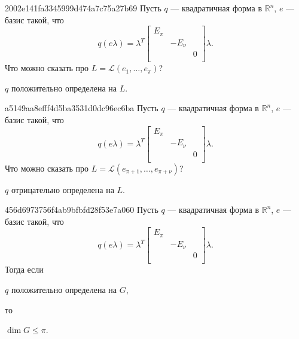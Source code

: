 \begin{note}{2002e141fa3345999d474a7c75a27b69}
    Пусть \({ q }\) --- квадратичная форма в \({ \mathbb R^{n} }\),
    \({ e }\) --- базис такой, что
    \[
        q(e\lambda) = \lambda^{T} \begin{bmatrix}
            E_{\pi}   \\
            & -E_{\nu} \\
            && 0      \\
        \end{bmatrix}
        \lambda.
    \]
    Что можно сказать про \({ L = \mathscr L (e_1, \ldots, e_{\pi}) }\)?

    \begin{cloze}{1}
        \({ q }\) положительно определена на \({ L }\).
    \end{cloze}
\end{note}

\begin{note}{a5149aa8efff4d5ba3531d0dc96ec6ba}
    Пусть \({ q }\) --- квадратичная форма в \({ \mathbb R^{n} }\),
    \({ e }\) --- базис такой, что
    \[
        q(e\lambda) = \lambda^{T} \begin{bmatrix}
            E_{\pi}   \\
            & -E_{\nu} \\
            && 0      \\
        \end{bmatrix}
        \lambda.
    \]
    Что можно сказать про \({ L = \mathscr L (e_{\pi + 1}, \ldots, e_{\pi + \nu}) }\)?

    \begin{cloze}{1}
        \({ q }\) отрицательно определена на \({ L }\).
    \end{cloze}
\end{note}

\begin{note}{456d6973756f4ab9bfbfd28f53e7a060}
    Пусть \({ q }\) --- квадратичная форма в \({ \mathbb R^{n} }\),
    \({ e }\) --- базис такой, что
    \[
        q(e\lambda) = \lambda^{T} \begin{bmatrix}
            E_{\pi}   \\
            & -E_{\nu} \\
            && 0      \\
        \end{bmatrix}
        \lambda.
    \]
    Тогда если \begin{icloze}{2}\({ q }\) положительно определена на \({ G }\),\end{icloze} то \begin{icloze}{1}\({ \dim G \leqslant \pi }\).\end{icloze}
\end{note}

